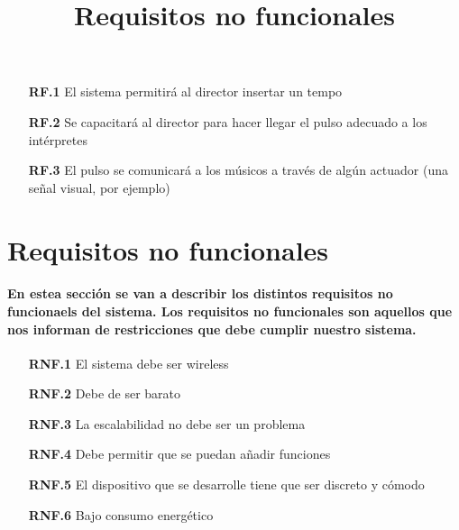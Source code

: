 \begin{itemize}
    \item[\textbf{RF.1}] El sistema permitirá al director insertar un tempo
    \item[\textbf{RF.2}] Se capacitará al director para hacer llegar el pulso adecuado a los intérpretes
    \item[\textbf{RF.3}] El pulso se comunicará a los músicos a través de algún actuador (una señal visual, por ejemplo)
\end{itemize}


\title{Requisitos no funcionales}
\section{Requisitos no funcionales}

\paragraph{
En estea sección se van a describir los distintos requisitos no funcionaels del sistema.
Los requisitos no funcionales son aquellos que nos informan de restricciones que debe cumplir
nuestro sistema.
}

\begin{itemize}
    \item[\textbf{RNF.1}] El sistema debe ser wireless
    \item[\textbf{RNF.2}] Debe de ser barato
    \item[\textbf{RNF.3}] La escalabilidad no debe ser un problema
    \item[\textbf{RNF.4}] Debe permitir que se puedan añadir funciones
    \item[\textbf{RNF.5}] El dispositivo que se desarrolle tiene que ser discreto y cómodo
    \item[\textbf{RNF.6}] Bajo consumo energético
\end{itemize}
